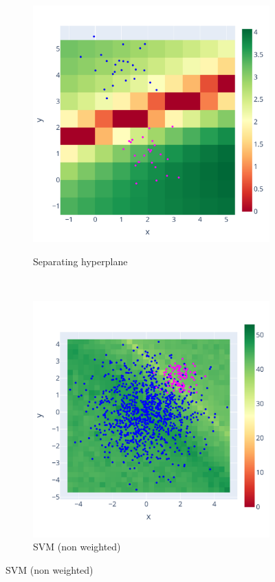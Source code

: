 \documentclass[11pt]{article}
\begin{document}
\begin{figure}
    \centering
    \begin{subfigure}{.3\linewidth}
    \caption{Separating hyperplane}
    \includegraphics[width=\linewidth]{figure/separating_hyperplan/hyperplane_zoom.pdf}
    \label{fig:hyperplan_sig_zoom}
    \end{subfigure} \\
    \begin{subfigure}{.3\linewidth}
    \caption{SVM (non weighted)}
    \includegraphics[width=\linewidth]{figure/SVM/non_weighted.pdf}

\end{subfigure}
\end{figure}
\end{document}

